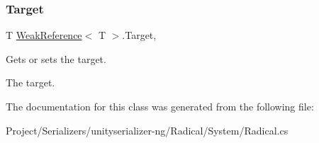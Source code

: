\subsubsection{\texorpdfstring{Target}{Target}}
{\footnotesize\ttfamily T \hyperlink{class_weak_reference}{Weak\+Reference}$<$ T $>$.Target\hspace{0.3cm}{\ttfamily [get]}, {\ttfamily [set]}}



Gets or sets the target. 

The target.

The documentation for this class was generated from the following file\+:\begin{DoxyCompactItemize}
\item 
Project/\+Serializers/unityserializer-\/ng/\+Radical/\+System/Radical.\+cs\end{DoxyCompactItemize}
